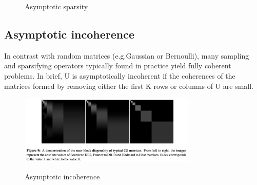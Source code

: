 \documentclass{article}
\begin{document}
\begin{figure}[ht]
 \centering    
 \hfill
 \caption{Asymptotic sparsity}
\end{figure}


\subsection{Asymptotic incoherence}
In contrast with random matrices (e.g.Gaussian or Bernoulli), many sampling and sparsifying operators typically found in practice yield fully coherent problems.  In brief, U is asymptotically incoherent if the coherences of the matrices formed by removing either the first K rows or columns of U are small. 


\begin{figure}[ht]
 \centering  
 \includegraphics[width=0.75\textwidth]{Figures/Incoherence.png}
 \label{fig:1}
 \caption{Asymptotic incoherence}
\end{figure}
\end{document}
